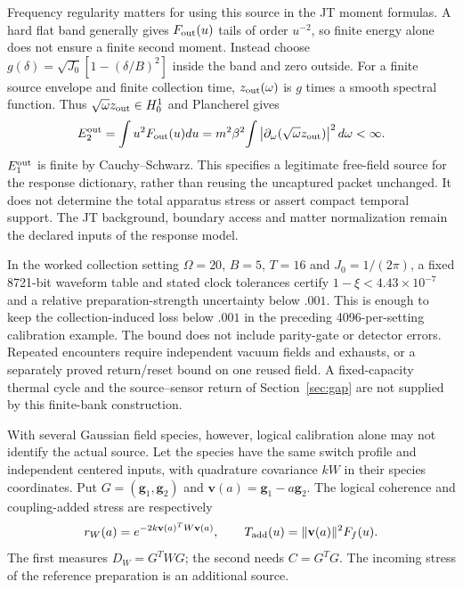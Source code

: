 Frequency regularity matters for using this source in the JT moment formulas.
A hard flat band generally gives $F_{\rm out}(u)$ tails of order $u^{-2}$,
so finite energy alone does not ensure a finite second moment. Instead choose
$g(\delta)=\sqrt{J_0}[1-(\delta/B)^2]$ inside the band and zero outside.
For a finite source envelope and finite collection time,
$z_{\rm out}(\omega)$ is $g$ times a smooth spectral function. Thus
$\sqrt\omega z_{\rm out}\in H^1_0$ and Plancherel gives
\begin{equation}
 E_2^{\rm out}=\int u^2F_{\rm out}(u)du
 =m^2\beta^2\!\int
 \left|\partial_\omega(\sqrt\omega z_{\rm out})\right|^2d\omega<\infty.
 \label{eq:band-second-moment}
\end{equation}
$E_1^{\rm out}$ is finite by Cauchy--Schwarz. This specifies a legitimate
free-field source for the response dictionary, rather than reusing the
uncaptured packet unchanged. It does not determine the total apparatus stress
or assert compact temporal support. The JT background, boundary access and
matter normalization remain the declared inputs of the response model.

In the worked collection setting $\Omega=20$, $B=5$, $T=16$ and
$J_0=1/(2\pi)$, a fixed 8721-bit waveform table and stated clock tolerances
certify $1-\xi<4.43\times10^{-7}$ and a relative preparation-strength
uncertainty below $.001$. This is enough to keep the collection-induced loss
below $.001$ in the preceding 4096-per-setting calibration example. The bound
does not include parity-gate or detector errors. Repeated encounters require
independent vacuum fields and exhausts, or a separately proved return/reset
bound on one reused field. A fixed-capacity thermal cycle and the source--sensor
return of Section~\ref{sec:gap} are not supplied by this finite-bank construction.

With several Gaussian field species, however, logical calibration alone may
not identify the actual source. Let the species have the same switch profile
and independent centered inputs, with quadrature covariance $kW$ in their
species coordinates. Put $G=(\mathbf g_1,\mathbf g_2)$ and
$\mathbf v(a)=\mathbf g_1-a\mathbf g_2$. The logical coherence and
coupling-added stress are respectively
\begin{equation}
 r_W(a)=e^{-2k\mathbf v(a)^TW\mathbf v(a)},\qquad
 T_{\rm add}(u)=\|\mathbf v(a)\|^2F_f(u).
 \label{eq:weighted-noise-source}
\end{equation}
The first measures $D_W=G^TWG$; the second needs $C=G^TG$.
The incoming stress of the reference preparation is an additional source.

